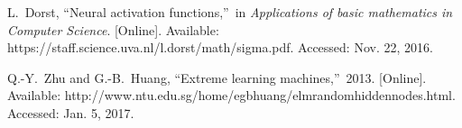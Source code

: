 \documentclass[journal,comsoc]{IEEEtran}
\begin{document}
\begin{thebibliography}{1}
 L.~Dorst, \textquotedblleft Neural activation functions,\textquotedblright \ in {\it Applications of basic mathematics in Computer Science}. [Online]. Available: https://staff.science.uva.nl/l.dorst/math/sigma.pdf. Accessed: Nov. 22, 2016.

 Q.-Y.~Zhu and G.-B.~Huang, \textquotedblleft Extreme learning machines,\textquotedblright \ 2013. [Online]. Available: http://www.ntu.edu.sg/home/egbhuang/elm\textunderscore random\textunderscore hidden\textunderscore nodes.html. Accessed: Jan. 5, 2017.

\end{thebibliography}

% 










\end{document}
